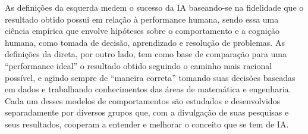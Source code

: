 \documentclass[
	12pt,				%
	openright,			%
	oneside,			%
	a4paper,			%
	english,			%
	spanish,			%
	brazil				%
	]{abntex2}
\begin{document}
	As definições da esquerda medem o sucesso da \gls{IA} baseando-se na fidelidade que o resultado obtido possui em relação à performance humana, sendo essa uma ciência empírica que envolve hipóteses sobre o comportamento e a cognição humana, como tomada de decisão, aprendizado e resolução de problemas. As definições da direta, por outro lado, tem como base de comparação para uma ``performance ideal'' o resultado obtido seguindo o caminho mais racional possível, e agindo sempre de ``maneira correta'' tomando suas decisões baseadas em dados e trabalhando conhecimentos das áreas de matemática e engenharia. Cada um desses modelos de comportamentos são estudados e desenvolvidos separadamente por diversos grupos que, com a divulgação de suas pesquisas e seus resultados, cooperam a entender e melhorar o conceito que se tem de \gls{IA}. \cite{norvig3rd}
	 
\end{document}
